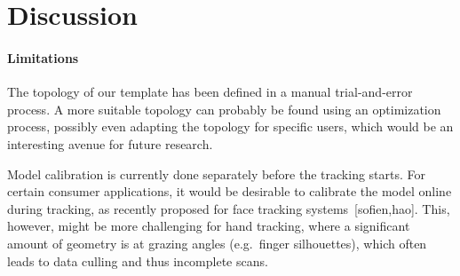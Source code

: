 \section{Discussion}
\label{sec:discussion}

\paragraph{Limitations}


The topology of our template has been defined in a manual trial-and-error process. A more suitable topology can probably be found using an optimization process, possibly even adapting the topology for specific users, which would be an interesting avenue for future research.

Model calibration is currently done separately before the tracking starts. For certain consumer applications, it would be desirable to calibrate the model online during tracking, as recently proposed for face tracking systems~[sofien,hao]. This, however, might be more challenging for hand tracking, where a significant amount of geometry is at grazing angles (e.g.\ finger silhouettes), which often leads to data culling and thus incomplete scans.

